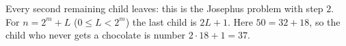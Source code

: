Every second remaining child leaves: this is the Josephus problem with step $2$. For $n=2^m+L$ ($0\le L<2^m$) the last child is $2L+1$. Here $50=32+18$, so the child who never gets a chocolate is number $2\cdot18+1=\boxed{37}$.
